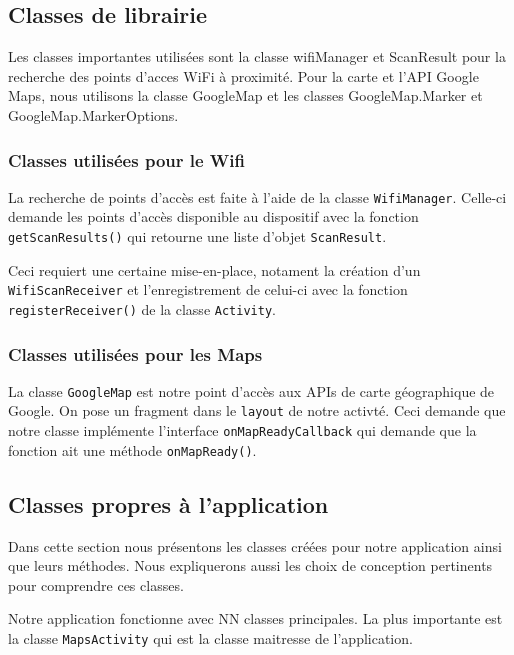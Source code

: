 \documentclass[12pt]{article}
\newcommand\code[1]{\texttt{#1}}
\begin{document}
\subsection{Classes de librairie}

	Les classes importantes utilisées sont la classe wifiManager et ScanResult
	pour la recherche des points d'acces WiFi à proximité.  Pour la carte et
	l'API Google Maps, nous utilisons la classe GoogleMap et les classes
	GoogleMap.Marker et GoogleMap.MarkerOptions.

\subsubsection{Classes utilisées pour le Wifi}

	La recherche de points d'accès est faite à l'aide de la classe
	\code{WifiManager}.  Celle-ci demande les points d'accès disponible au
	dispositif avec la fonction \code{getScanResults()} qui retourne une liste
	d'objet \code{ScanResult}.

	Ceci requiert une certaine mise-en-place, notament la création d'un
	\code{WifiScanReceiver} et l'enregistrement de celui-ci avec la fonction
	\code{registerReceiver()} de la classe \code{Activity}.

\subsubsection{Classes utilisées pour les Maps}

	La classe \code{GoogleMap} est notre point d'accès aux APIs de carte
	géographique de Google.  On pose un fragment dans le \code{layout} de notre
	activté.  Ceci demande que notre classe implémente l'interface
	\code{onMapReadyCallback} qui demande que la fonction ait une méthode
	\code{onMapReady()}.


\subsection{Classes propres à l'application}

	Dans cette section nous présentons les classes créées pour notre application
	ainsi que leurs méthodes.  Nous expliquerons aussi les choix de conception
	pertinents pour comprendre ces classes.

	Notre application fonctionne avec NN classes principales.  La plus
	importante est la classe \code{MapsActivity} qui est la classe maitresse de
	l'application.
\end{document}
